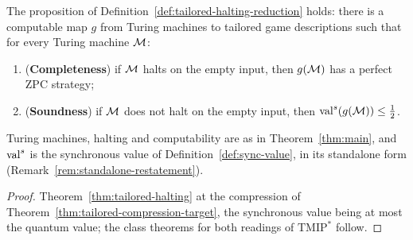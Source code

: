\begin{theorem}[$\mathrm{TMIP}^* = \RE$; II:1505, Theorem~7.4 of~\cite{BCLV24}]
\label{thm:tmip-re}
\leanok
The proposition of Definition~\ref{def:tailored-halting-reduction} holds: there is a computable
map $g$ from Turing machines to tailored game descriptions such that for every Turing machine
$\mathcal{M}$:
\begin{enumerate}
\item (\textbf{Completeness}) if $\mathcal{M}$ halts on the empty input, then $g(\mathcal{M})$ has a
  perfect ZPC strategy;
\item (\textbf{Soundness}) if $\mathcal{M}$ does not halt on the empty input, then
  $\mathrm{val}^{s}(g(\mathcal{M})) \leq \frac12$.
\end{enumerate}
Turing machines, halting and computability are as in Theorem~\ref{thm:main}, and $\mathrm{val}^{s}$ is
the synchronous value of Definition~\ref{def:sync-value}, in its standalone form
(Remark~\ref{rem:standalone-restatement}).
\end{theorem}

\begin{proof}
\leanok
Theorem~\ref{thm:tailored-halting} at the compression of
Theorem~\ref{thm:tailored-compression-target}, the synchronous value being at most the quantum
value; the class theorems for both readings of $\mathrm{TMIP}^*$ follow.
\end{proof}


